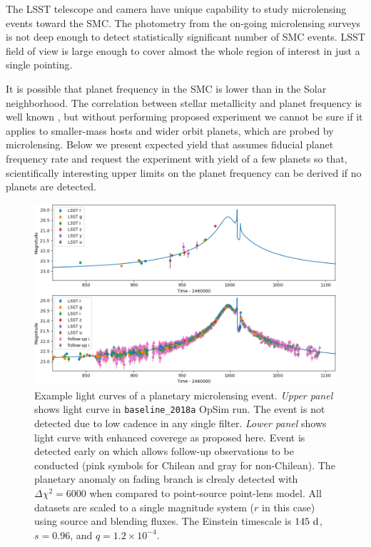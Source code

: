 \documentclass[12pt,letterpaper]{article}
\begin{document}
The LSST telescope and camera have unique capability 
to study microlensing events toward the SMC.  The photometry from the on-going 
microlensing surveys is not deep enough to detect statistically significant 
number of SMC events.  LSST field of view is large enough to cover almost 
the whole region of interest in just a single pointing.

It is possible that planet frequency in the SMC is lower than in 
the Solar neighborhood.  The correlation between stellar metallicity 
and planet frequency is well known \citep{fischervalenti05,wang15}, 
but without performing proposed experiment we cannot be sure if 
it applies to smaller-mass hosts and wider orbit planets, which are probed 
by microlensing.  Below we present expected yield that assumes fiducial 
planet frequency rate and request the experiment with yield of a few planets 
so that, scientifically interesting upper limits on 
the planet frequency can be derived if no planets are detected.





\clearpage

\begin{figure}
 \includegraphics[width=\textwidth]{plot_1}
 \caption{Example light curves of a planetary microlensing event. 
{\it Upper panel} shows light curve in {\tt baseline\_2018a} OpSim run.  
The event is not detected due to low cadence in any single filter.  
{\it Lower panel} shows light curve with enhanced coverege as proposed here. 
Event is detected early on which allows follow-up observations to be conducted 
(pink symbols for Chilean and gray for non-Chilean).  
The planetary anomaly on fading branch is clrealy detected with $\Delta\chi^2 = 6000$ 
when compared to point-source point-lens model.  
All datasets are scaled to a single magnitude system ($r$ in this case) 
using source and blending fluxes.  The Einstein timescale is $145~{\rm d}$, 
$s=0.96$, and $q=1.2\times10^{-4}$. } 
\end{figure}
\end{document}
